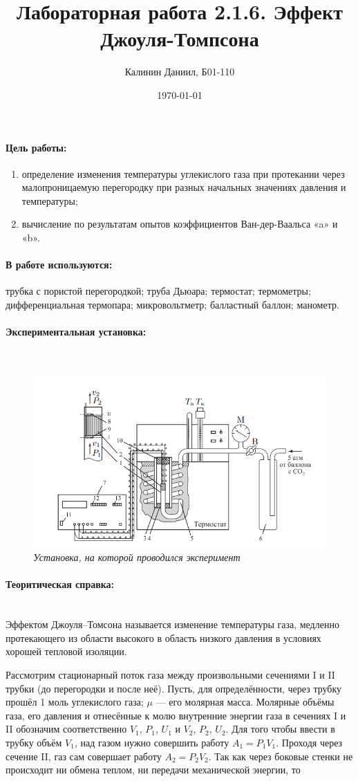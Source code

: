 \documentclass[a4paper, 12pt]{article}
\author{Калинин Даниил, Б01-110}
\date{\today}
\title{Лабораторная работа 2.1.6. Эффект Джоуля-Томпсона}
\newcommand{\parag}[1]{\paragraph*{#1:}}
\begin{document}
\maketitle

\parag {Цель работы}
\begin{enumerate}
    \item  определение изменения температуры углекислого газа при протекании через малопроницаемую перегородку при разных начальных значениях давления и температуры;
    \item вычисление по результатам опытов коэффициентов Ван-дер-Ваальса «a» и «b».
\end{enumerate}

\parag {В работе используются}
трубка с пористой перегородкой; труба Дьюара; термостат; термометры; дифференциальная термопара; микровольтметр; балластный баллон; манометр.

\parag {Экспериментальная установка}~\\
\begin{figure}[H]
    \centering
    \includegraphics[width=\linewidth]{setup.png}
    \caption{\textit{Установка, на которой проводился эксперимент}}
    \label{setup}
\end{figure}

\parag {Теоритическая справка} ~\\
Эффектом  Джоуля–Томсона называется изменение температуры газа, медленно протекающего из области высокого в область низкого давления в условиях хорошей тепловой изоляции.

Рассмотрим стационарный поток газа между произвольными сечениями I и II трубки (до перегородки и после неё). Пусть, для определённости, через трубку прошёл 1 моль углекислого газа; $\mu$ — его молярная масса. Молярные объёмы газа, его давления и отнесённые к молю внутренние энергии газа в сечениях I и II обозначим соответственно $V_1$, $P_1$, $U_1$ и $V_2$, $P_2$, $U_2$. Для того чтобы ввести в трубку объём $V_1$, над газом нужно совершить работу $A_1 = P_1 V_1$. Проходя через сечение II, газ сам совершает работу $A_2 = P_2 V_2$. Так как через боковые стенки не происходит ни обмена теплом, ни передачи механической энергии, то
\end{document}
